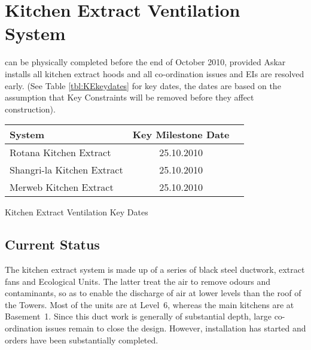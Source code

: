 \newcommand{\keextracton}{25.10.2010}
\newcommand{\ecolon}{25.10.2010}           %
\newcommand{\podiumon}{26.10.2010}
\newcommand{\toweron}{15.10.2010}
\newcommand{\kdpoweron}{20.10.2010}

\chapter{Kitchen Extract Ventilation System }

 can be physically completed before the end of October 2010, provided Askar installs all kitchen extract hoods and all co-ordination issues and EIs are resolved early. (See Table \ref{tbl:KEkeydates} for key dates, the dates are based on the assumption that Key Constraints will be removed before they affect construction).


           \begin{margintable} 
	    \begin{tabular}{lcl}
	      \toprule
	      System    & Key Milestone Date  \\
	      \midrule

                 Rotana Kitchen Extract       &  \ecolon  \\   
                 Shangri-la Kitchen Extract   & \ecolon\\
	     Merweb Kitchen Extract       &  \ecolon  \\
	      
	      \bottomrule
	    \end{tabular}
           \caption{Kitchen Extract Ventilation Key Dates}
           \label{tbl:KEkeydates}
            \end{margintable}
 

\section{Current Status}

The kitchen extract system is made up of a series of black steel ductwork, extract fans and Ecological Units. The latter treat the air to  remove odours and contaminants, so as to enable the discharge of air at lower levels than the roof of the Towers. Most of the units are at Level~6, whereas the main kitchens are at Basement~1. Since this duct work is generally of substantial depth, large co-ordination issues remain to close the design. However, installation has started and orders have been substantially completed.

